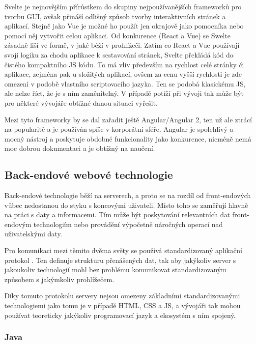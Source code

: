 		Svelte je nejnovějším přírůstkem do skupiny nejpoužívanějších frameworků pro tvorbu \Ac{GUI}, avšak přináší odlišný
		způsob tvorby interaktivních stránek a aplikací.
		Stejně jako Vue je možné ho použít jen okrajově jako pomocníka nebo pomocí něj vytvořit celou aplikaci.
		Od konkurence (React a Vue) se Swelte zásadně liší ve formě, v jaké běží v prohlížeči.
		Zatím co React a Vue používají svoji logiku za chodu aplikace k sestavování stránek, Svelte překládá kód
		do čistého kompaktního \ac{JS} kódu.
		To má vliv především na rychlost celé stránky či aplikace, zejména pak u složitých aplikací,
		ovšem za cenu vyšší rychlosti je zde omezení v podobě vlastního scriptovacího jazyka. \cite{svelte_basics}
		Ten se podobá klasickému \ac{JS}, ale nelze říct, že je s ním zaměnitelný.
		V případě potíží při vývoji tak může být pro některé vývojáře obtížné danou situaci vyřešit. \cite{vue_vs_svelte}

		Mezi tyto frameworky by se dal zařadit ještě Angular/Angular 2, ten už ale ztrácí na popularitě a je používán spíše v
		korporátní sféře.
		Angular je spolehlivý a mocný nástroj a poskytuje obdobné funkcionality jako konkurence,
		nicméně nemá moc dobrou dokumentaci a je obtížný na naučení. \cite{react_vs_angular}

	\subsection{Back-endové webové technologie}

	Back-endové technologie běží na serverech, a proto se na rozdíl od front-endových vůbec nedostanou do styku s koncovými uživateli.
	Místo toho se zaměřují hlavně na práci s daty a informacemi.
	Tím může být poskytování relevantních dat front-endovým technologiím nebo provádění výpočetně náročných operací
	nad uživatelskými daty.

	Pro komunikaci mezi těmito dvěma světy se používá standardizovaný aplikační protokol .
	Ten definuje strukturu přenášených dat, tak aby jakýkoliv server s jakoukoliv technologií mohl bez problému komunikovat
	standardizovaným způsobem s jakýmkoliv prohlížečem. \cite{http}

	Díky tomuto protokolu servery nejsou omezeny základními standardizovanými technologiemi jako tomu je v případě
	\Ac{HTML}, \Ac{CSS} a \ac{JS}, a vývojáři tak mohou používat teoreticky jakýkoliv programovací jazyk a ekosystém s ním
	spojený.

		\subsubsection{Java}

